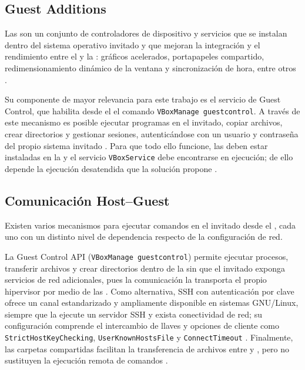 \subsection{Guest Additions}

Las \guestadditions{} son un conjunto de controladores de dispositivo y servicios que se instalan dentro del sistema operativo invitado y que mejoran la integración y el rendimiento entre el \host{} y la \vm{}: gráficos acelerados, portapapeles compartido, redimensionamiento dinámico de la ventana y sincronización de hora, entre otros \parencite{virtualbox_guestadditions}.

Su componente de mayor relevancia para este trabajo es el servicio de Guest Control, que habilita desde el \host{} el comando \texttt{VBoxManage guestcontrol}. A través de este mecanismo es posible ejecutar programas en el invitado, copiar archivos, crear directorios y gestionar sesiones, autenticándose con un usuario y contraseña del propio sistema invitado \parencite{virtualbox_guestcontrol, virtualbox_advanced_topics}. Para que todo ello funcione, las \guestadditions{} deben estar instaladas en la \vm{} y el servicio \texttt{VBoxService} debe encontrarse en ejecución; de ello depende la ejecución desatendida que la solución propone \parencite{virtualbox_guestadditions}.

\subsection{Comunicación Host--Guest}

Existen varios mecanismos para ejecutar comandos en el invitado desde el \host{}, cada uno con un distinto nivel de dependencia respecto de la configuración de red.

La Guest Control API (\texttt{VBoxManage guestcontrol}) permite ejecutar procesos, transferir archivos y crear directorios dentro de la \vm{} sin que el invitado exponga servicios de red adicionales, pues la comunicación la transporta el propio hipervisor por medio de las \guestadditions{} \parencite{virtualbox_guestcontrol, virtualbox_advanced_topics}. Como alternativa, SSH con autenticación por clave ofrece un canal estandarizado y ampliamente disponible en sistemas GNU/Linux, siempre que la \vm{} ejecute un servidor SSH y exista conectividad de red; su configuración comprende el intercambio de llaves y opciones de cliente como \texttt{StrictHostKeyChecking}, \texttt{UserKnownHostsFile} y \texttt{ConnectTimeout} \parencite{ssh_key_auth, ssh_config}. Finalmente, las carpetas compartidas facilitan la transferencia de archivos entre \host{} y \vm{}, pero no sustituyen la ejecución remota de comandos \parencite{virtualbox_advanced_topics}.

